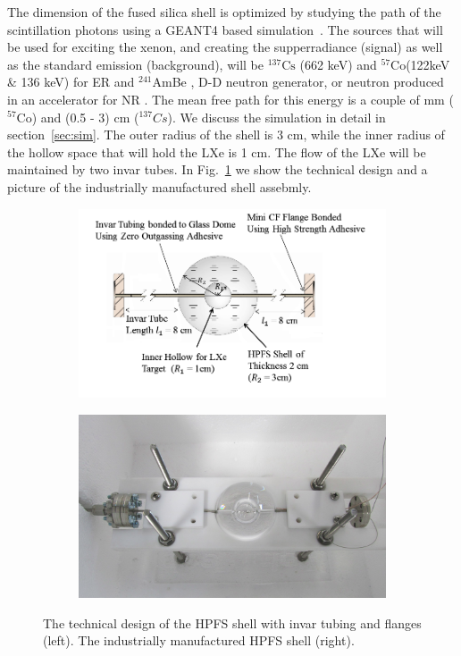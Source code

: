The dimension of the fused silica shell is optimized by studying the path of the scintillation photons using a GEANT4 based simulation~\cite{Agostinelli:2002hh}. 
The sources that will be used for exciting the xenon, and creating the supperradiance (signal) as well as the standard emission (background), 
will be $^{137} \mathrm{Cs}$ (662 keV) and $^{57} \mathrm{Co}$(122keV \& 136 keV) for ER and $^{241}$AmBe , D-D neutron generator, or neutron 
produced in an accelerator for NR . The mean free path for this energy is a couple of mm ($^{57} \mathrm{Co}$) and (0.5 - 3) cm ($^{137} Cs$).  
We discuss the simulation in detail in section~\ref{sec:sim}. 
The outer radius of the shell is 3 cm, while the inner radius of the hollow space that will hold the 
LXe is 1 cm. The flow of the LXe will be maintained by two invar tubes. In Fig.~\ref{fig:sphere} we show 
the technical design and a picture of the industrially manufactured shell assebmly. 




\begin{figure}
\centering
\begin{subfigure}[c]{0.4\textheight}
\includegraphics[width=\textwidth]{spheredesign1.png}
\end{subfigure}
\begin{subfigure}[c]{0.25\textheight}
\includegraphics[width=\textwidth]{spherephoto.png}
\end{subfigure}
\caption{The technical design of the HPFS shell with invar tubing and flanges (left). The industrially manufactured
HPFS shell (right).} 
\label{fig:sphere}
\end{figure}


